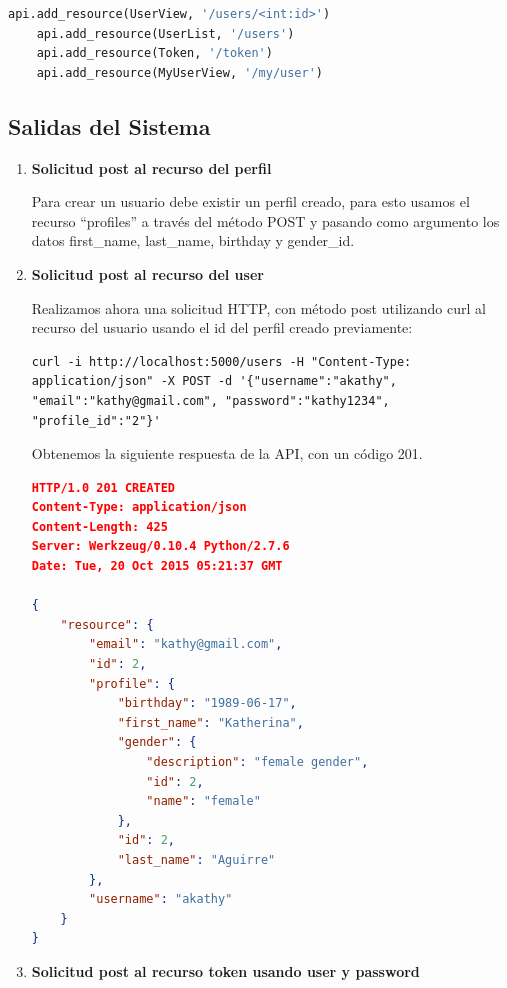 \documentclass[a4paper,12pt]{article}
\begin{document}
	\begin{lstlisting}[language=Python]
	api.add_resource(UserView, '/users/<int:id>')
	api.add_resource(UserList, '/users')
	api.add_resource(Token, '/token')
	api.add_resource(MyUserView, '/my/user')
	\end{lstlisting}

\subsection {Salidas del Sistema}

\begin{enumerate}
	\item \textbf{Solicitud post al recurso del perfil}
    
	Para crear un usuario debe existir un perfil creado, para esto usamos el recurso ``\/profiles'' a través del método POST y pasando como argumento los datos first\_name, last\_name, birthday y gender\_id.
    \item \textbf{Solicitud post al recurso del user}
    
    Realizamos ahora una solicitud HTTP, con método post utilizando curl al recurso del usuario usando el id del perfil creado previamente:

\begin{verbatim}
curl -i http://localhost:5000/users -H "Content-Type: 
application/json" -X POST -d '{"username":"akathy", 
"email":"kathy@gmail.com", "password":"kathy1234", 
"profile_id":"2"}'
\end{verbatim}
    
    Obtenemos la siguiente respuesta de la API, con un código 201.
    
\begin{lstlisting}[language=json]
HTTP/1.0 201 CREATED
Content-Type: application/json
Content-Length: 425
Server: Werkzeug/0.10.4 Python/2.7.6
Date: Tue, 20 Oct 2015 05:21:37 GMT

{
    "resource": {
        "email": "kathy@gmail.com", 
        "id": 2, 
        "profile": {
            "birthday": "1989-06-17", 
            "first_name": "Katherina", 
            "gender": {
                "description": "female gender", 
                "id": 2, 
                "name": "female"
            }, 
            "id": 2, 
            "last_name": "Aguirre"
        }, 
        "username": "akathy"
    }
}
\end{lstlisting}

    \item \textbf{Solicitud post al recurso token usando user y password}
    

\end{enumerate}
\end{document}
